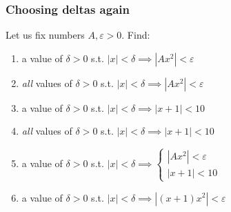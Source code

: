 \documentclass[14pt]{beamer}
\newcommand {\DS} [1] {${\displaystyle #1}$}
\newcommand{\e}{\varepsilon}
\newcommand{\p}{\pause}
\begin{document}
\begin{frame}[t]
\frametitle{Choosing deltas again} 

Let us fix numbers $A, \e >0$.  Find:

\vfill

\begin{enumerate}
	\item  a value of $\delta >0$ \; s.t.  \hfill \DS{|x|< \delta \implies |Ax^2|<\e}
\p \vfill
	\item  \emph{all} values of $\delta >0$ \; s.t.  \hfill \DS{|x|< \delta \implies |Ax^2|<\e}
\p \vfill
	\item a value of $\delta >0$ \; s.t.   \hfill \DS{|x|< \delta \implies |x+1| < 10}
\p \vfill
	\item \emph{all} values of $\delta >0$ \; s.t.   \hfill \DS{|x|< \delta \implies |x+1| < 10}
\p \vfill
	\item a value of $\delta >0$  \; s.t.   \hfill \DS{|x|< \delta \implies \left\{  \begin{array}{c} |Ax^2|<\e \\ |x+1| < 10 \end{array} \right. }
\p \vfill
	\item a value of $\delta >0$ \; s.t. \hfill \DS{|x| < \delta \implies |(x+1)x^2| < \e }
\vfill
\end{enumerate}

\end{frame}
\end{document}
